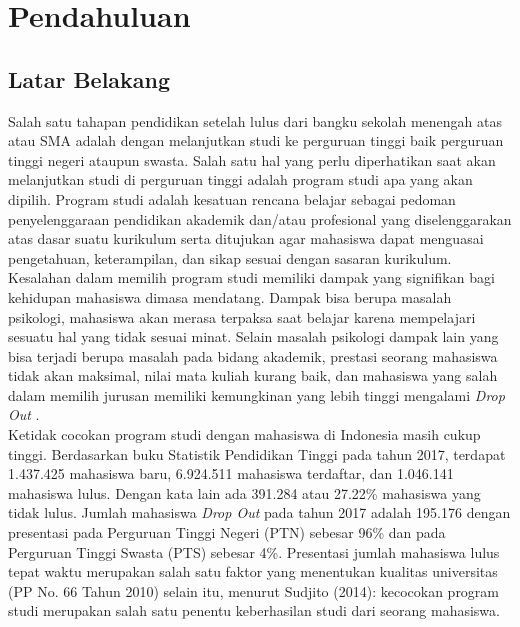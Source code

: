 \chapter{Pendahuluan}
\label{chap:intro}
   
\section{Latar Belakang}
\label{sec:label}
Salah satu tahapan pendidikan setelah lulus dari bangku sekolah menengah atas atau SMA adalah dengan melanjutkan studi ke perguruan tinggi baik perguruan tinggi negeri ataupun swasta. Salah satu hal yang perlu diperhatikan saat akan melanjutkan studi di perguruan tinggi adalah program studi apa yang akan dipilih. Program studi adalah kesatuan rencana belajar sebagai pedoman penyelenggaraan pendidikan akademik dan/atau profesional yang diselenggarakan atas dasar suatu kurikulum serta ditujukan agar mahasiswa dapat menguasai pengetahuan, keterampilan, dan sikap sesuai dengan sasaran kurikulum.\\ %

Kesalahan dalam memilih program studi memiliki dampak yang signifikan bagi kehidupan mahasiswa dimasa mendatang. Dampak bisa berupa masalah psikologi, mahasiswa akan merasa terpaksa saat belajar karena mempelajari sesuatu hal yang tidak sesuai minat. Selain masalah psikologi dampak lain yang bisa terjadi berupa masalah pada bidang akademik, prestasi seorang mahasiswa tidak akan maksimal, nilai mata kuliah kurang baik, dan mahasiswa yang salah dalam memilih jurusan memiliki kemungkinan yang lebih tinggi mengalami \textit{Drop Out} .\\


Ketidak cocokan program studi dengan mahasiswa di Indonesia masih cukup tinggi. Berdasarkan buku Statistik Pendidikan Tinggi pada tahun 2017, terdapat 1.437.425 mahasiswa baru, 6.924.511 mahasiswa terdaftar, dan 1.046.141 mahasiswa lulus. Dengan kata lain ada 391.284 atau 27.22\% mahasiswa yang tidak lulus. Jumlah mahasiswa \textit{Drop Out} pada tahun 2017 adalah 195.176 dengan presentasi pada Perguruan Tinggi Negeri (PTN) sebesar 96\% dan pada Perguruan Tinggi Swasta (PTS) sebesar 4\%. Presentasi jumlah mahasiswa lulus tepat waktu merupakan salah satu faktor yang menentukan kualitas universitas (PP No. 66 Tahun 2010) selain itu, menurut Sudjito (2014): kecocokan program studi merupakan salah satu penentu keberhasilan studi dari seorang mahasiswa.\\ %

